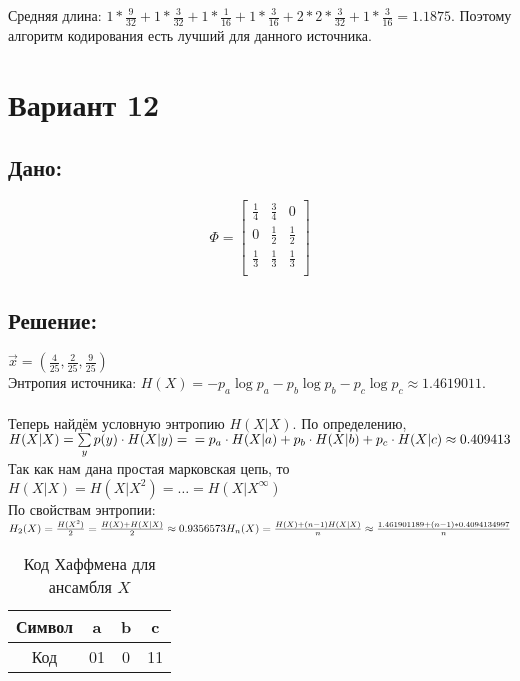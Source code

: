 \documentclass{article}
\begin{document}
Средняя длина: $1 * \frac{9}{32} + 1 * \frac{3}{32} + 1 * \frac{1}{16} + 1 * \frac{3}{16} + 2 * 2 * \frac{3}{32} + 1 * \frac{3}{16} = 1.1875$. Поэтому алгоритм кодирования есть лучший для данного источника. 
\newpage
\section{Вариант 12}
\subsection{Дано:}
\[
   \Phi =
  \left[ {\begin{array}{ccc}
   \frac{1}{4} & \frac{3}{4} & 0 \\[1em]
   0 & \frac{1}{2} & \frac{1}{2} \\[1em]
   \frac{1}{3} & \frac{1}{3} & \frac{1}{3} \\
  \end{array} } \right]
\]
\subsection{Решение:}
$\overrightarrow{x} = (\frac{4}{25}, \frac{2}{25}, \frac{9}{25})$\\
Энтропия источника:
$H(X) = -p_a\log{p_a} - p_b\log{p_b} - p_c\log{p_c} \approx 1{.}4619011$. \\\\
Теперь найдём условную энтропию $H(X|X)$. По определению,\\
$
H(X|X) = \sum\limits_{y} p(y) \cdot H(X|y) =\\
= p_a \cdot H(X|a) + p_b \cdot H(X|b) + p_c \cdot H(X|c) \approx 0{.}409413 $\\
Так как нам дана простая марковская цепь, то $H(X|X) = H(X|X^2) = \dots = H(X|X^{\infty})$\\
По свойствам энтропии:\\
$
H_2(X) = \frac{H(X^2)}{2} = \frac{H(X) + H(X|X)}{2} \approx 0{.}9356573 \\ \\
H_n(X) = \frac{H(X) + (n - 1)H(X|X)}{n} \approx \frac{1{.}461901189 + (n-1)*0{.}4094134997}{n}
$

\begin{table}[H]
\begin{tabular}{|c|c|c|c|}
    \hline
  Символ      & a              & b              & c             \\
    \hline
  Код         & 01             & 0              & 11             \\
    \hline
\end{tabular}
\captionsetup{singlelinecheck=off,justification=raggedright}
\caption{\label{tab:widgets}Код Хаффмена для ансамбля $X$}
\end{table}
\end{document}

